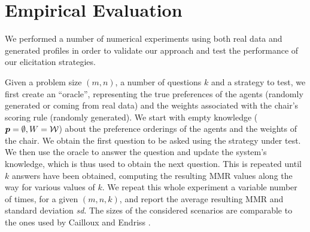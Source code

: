 \documentclass[runningheads]{llncs}
\begin{document}

\section{Empirical Evaluation} 
\label{sec:experiments}
We  performed a number of numerical experiments using both real data and generated profiles in order to validate our approach and test the performance of our elicitation strategies. %

Given a problem size $(m, n)$, a number of questions $k$ and a strategy to test, we first create an “oracle”, representing the true preferences of the agents (randomly generated or coming from real data) and the weights associated with the chair’s scoring rule (randomly generated).
We start with empty knowledge (${\bm{p}} = \emptyset, W = \mathcal{W}$) about the preference orderings of the agents and the weights %
of the chair. We obtain the first question to be asked using the strategy under test. We then use the oracle to answer the question and update the system's knowledge, which is thus used to obtain the next question. This is repeated until $k$ answers have been obtained, computing the resulting MMR values along the way for various values of $k$. We repeat this whole experiment a variable number of times, for a given $(m, n, k)$, and report the average resulting MMR and standard deviation \textit{sd}. The sizes of the considered scenarios are comparable to the ones used by Cailloux and Endriss \cite{Cailloux2014}. 
\end{document}
